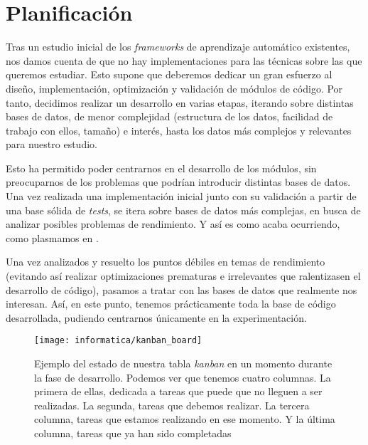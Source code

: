 \section{Planificación} \label{isec:planificacion}

Tras un estudio inicial de los \textit{frameworks} de aprendizaje automático existentes, nos damos cuenta de que no hay implementaciones para las técnicas sobre las que queremos estudiar. Esto supone que deberemos dedicar un gran esfuerzo al diseño, implementación, optimización y validación de módulos de código. Por tanto, decidimos realizar un desarrollo en varias etapas, iterando sobre distintas bases de datos, de menor complejidad (estructura de los datos, facilidad de trabajo con ellos, tamaño) e interés, hasta los datos más complejos y relevantes para nuestro estudio.

Esto ha permitido poder centrarnos en el desarrollo de los módulos, sin preocuparnos de los problemas que podrían introducir distintas bases de datos. Una vez realizada una implementación inicial junto con su validación a partir de una base sólida de \textit{tests}, se itera sobre bases de datos más complejas, en busca de analizar posibles problemas de rendimiento. Y así es como acaba ocurriendo, como plasmamos en .

Una vez analizados y resuelto los puntos débiles en temas de rendimiento (evitando así realizar optimizaciones prematuras e irrelevantes que ralentizasen el desarrollo de código), pasamos a tratar con las bases de datos que realmente nos interesan. Así, en este punto, tenemos prácticamente toda la base de código desarrollada, pudiendo centrarnos únicamente en la experimentación.

\begin{figure}[H]
    \centering
    \texttt{[image: informatica/kanban\_board]}
    \caption{Ejemplo del estado de nuestra tabla \textit{kanban} en un momento durante la fase de desarrollo. Podemos ver que tenemos cuatro columnas. La primera de ellas, dedicada a tareas que puede que no lleguen a ser realizadas. La segunda, tareas que debemos realizar. La tercera columna, tareas que estamos realizando en ese momento. Y la última columna, tareas que ya han sido completadas}
\end{figure}

